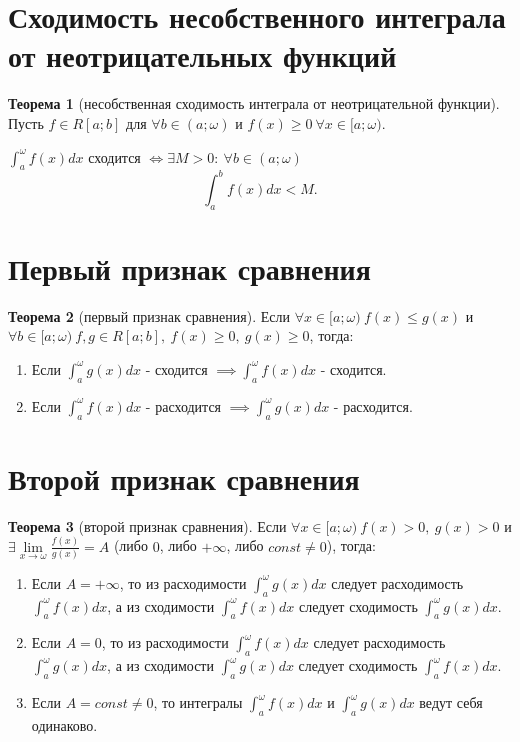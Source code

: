 \documentclass{report}
\theoremstyle{definition}
\newtheorem*{theorem}{Теорема}
\begin{document}
\section{Сходимость несобственного интеграла от неотрицательных функций}

\begin{theorem}[несобственная сходимость интеграла от неотрицательной функции]
    Пусть $f\in R[a;b]$ для $\forall b \in (a;\omega)$ и $f(x) \geqslant 0 \ \forall x \in [a;\omega).$

    $\int_{a}^{\omega}f(x)dx$ сходится $\iff \exists M > 0: \ \forall b \in (a;\omega)$
    \begin{equation*}
        \int_{a}^{b}f(x)dx < M.
    \end{equation*}
\end{theorem}

\section{Первый признак сравнения}

\begin{theorem}[первый признак сравнения]
    Если $\forall x \in [a;\omega) \ f(x) \leqslant g(x)$ и $\forall b \in [a;\omega) \ f,g \in R[a;b], \
        f(x) \geqslant 0, \ g(x) \geqslant 0$, тогда:
    \begin{enumerate}
        \item Если $\int_{a}^{\omega}g(x)dx$ - сходится $\implies \int_{a}^{\omega}f(x)dx$ - сходится.
        \item Если $\int_{a}^{\omega}f(x)dx$ - расходится $\implies \int_{a}^{\omega}g(x)dx$ - расходится.
    \end{enumerate}
\end{theorem}

\section{Второй признак сравнения}

\begin{theorem}[второй признак сравнения]
    Если $\forall x \in [a;\omega) \ f(x) > 0, \ g(x) > 0$ и $\exists \underset{x\rightarrow \omega}{\lim}
        \frac{f(x)}{g(x)} = A$ (либо $0$, либо $+\infty$, либо $const \ne 0$), тогда:
    \begin{enumerate}
        \item Если $A = +\infty$, то из расходимости $\int_{a}^{\omega}g(x)dx$ следует расходимость $\int_{a}^{\omega}
                  f(x)dx$, а из сходимости $\int_{a}^{\omega}f(x)dx$ следует сходимость $\int_{a}^{\omega}g(x)dx$.
        \item Если $A = 0$, то из расходимости $\int_{a}^{\omega}f(x)dx$ следует расходимость $\int_{a}^{\omega}
                  g(x)dx$, а из сходимости $\int_{a}^{\omega}g(x)dx$ следует сходимость $\int_{a}^{\omega}f(x)dx$.
        \item Если $A = const \ne 0$, то интегралы $\int_{a}^{\omega}f(x)dx$ и $\int_{a}^{\omega}g(x)dx$ ведут
              себя одинаково.
    \end{enumerate}
\end{theorem}
\end{document}
